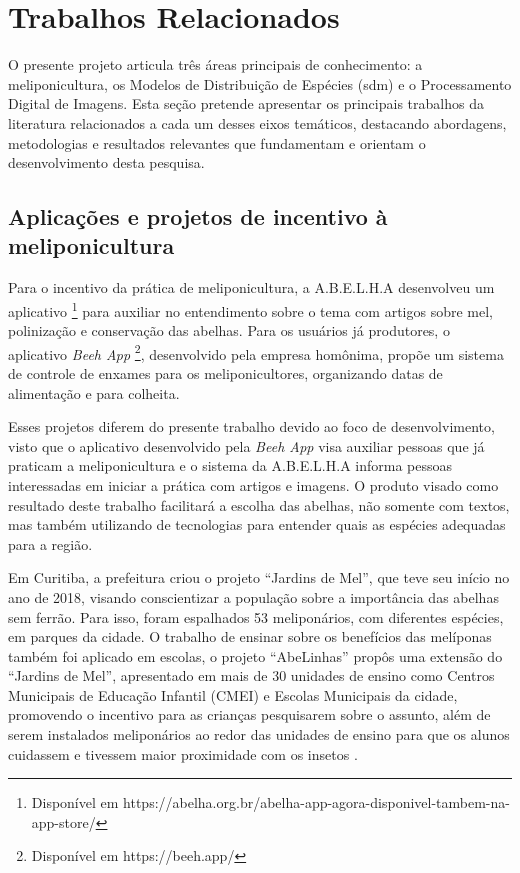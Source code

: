 \section{Trabalhos Relacionados}
O presente projeto articula três áreas principais de conhecimento: a meliponicultura, os Modelos de Distribuição de Espécies (\gls{sdm}) e o Processamento Digital de Imagens. Esta seção pretende apresentar os principais trabalhos da literatura relacionados a cada um desses eixos temáticos, destacando abordagens, metodologias e resultados relevantes que fundamentam e orientam o desenvolvimento desta pesquisa.

\subsection{Aplicações e projetos de incentivo à meliponicultura}
Para o incentivo da prática de meliponicultura, a A.B.E.L.H.A desenvolveu um aplicativo \footnote{Disponível em https://abelha.org.br/abelha-app-agora-disponivel-tambem-na-app-store/} para auxiliar no entendimento sobre o tema com artigos sobre mel, polinização e conservação das abelhas. Para os usuários já produtores, o aplicativo \textit{Beeh App} \footnote{Disponível em https://beeh.app/}, desenvolvido pela empresa homônima, propõe um sistema de controle de enxames para os meliponicultores, organizando datas de alimentação e para colheita. 

Esses projetos diferem do presente trabalho devido ao foco de desenvolvimento, visto que o aplicativo desenvolvido pela \textit{Beeh App} visa auxiliar pessoas que já praticam a meliponicultura e o sistema da A.B.E.L.H.A informa pessoas interessadas em iniciar a prática com artigos e imagens. O produto visado como resultado deste trabalho facilitará a escolha das abelhas, não somente com textos, mas também utilizando de tecnologias para entender quais as espécies adequadas para a região. 

Em Curitiba, a prefeitura criou o projeto ``Jardins de Mel'', que teve seu início no ano de 2018, visando conscientizar a população sobre a importância das abelhas sem ferrão. Para isso, foram espalhados 53 meliponários, com diferentes espécies, em parques da cidade. O trabalho de ensinar sobre os benefícios das melíponas também foi aplicado em escolas, o projeto ``AbeLinhas'' propôs uma extensão do ``Jardins de Mel'', apresentado em mais de 30 unidades de ensino como Centros Municipais de Educação Infantil (CMEI) e Escolas Municipais da cidade, promovendo o incentivo para as crianças pesquisarem sobre o assunto, além de serem instalados meliponários ao redor das unidades de ensino para que os alunos cuidassem e tivessem maior proximidade com os insetos \cite{abeLinhas:2019}.




